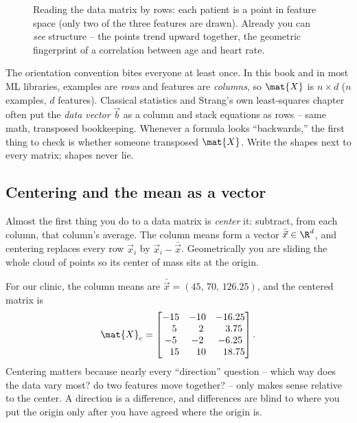 \begin{figure}[H]
\centering
{}
\caption{Reading the data matrix by rows: each patient is a point in feature space (only
two of the three features are drawn). Already you can \emph{see} structure -- the points
trend upward together, the geometric fingerprint of a correlation between age and heart
rate.}
\label{ch34:fig-datacloud}
\end{figure}

\begin{trapbox}
The orientation convention bites everyone at least once. In this book and in most ML
libraries, examples are \emph{rows} and features are \emph{columns}, so $\mat{X}$ is
$n \times d$ ($n$ examples, $d$ features). Classical statistics and Strang's own
least-squares chapter often put the \emph{data vector} $\vec{b}$ as a column and stack
equations as rows -- same math, transposed bookkeeping. Whenever a formula looks
``backwards,'' the first thing to check is whether someone transposed $\mat{X}$. Write
the shapes next to every matrix; shapes never lie.
\end{trapbox}

\subsection{Centering and the mean as a vector}

Almost the first thing you do to a data matrix is \emph{center} it: subtract, from each
column, that column's average. The column means form a vector $\bar{\vec{x}} \in \R^{d}$,
and centering replaces every row $\vec{x}_i$ by $\vec{x}_i - \bar{\vec{x}}$. Geometrically
you are sliding the whole cloud of points so its center of mass sits at the origin.

For our clinic, the column means are $\bar{\vec{x}} = (45,\,70,\,126.25)$, and the
centered matrix is
\[
\mat{X}_c =
\begin{bmatrix}
-15 & -10 & -16.25 \\
\phantom{-}5 & \phantom{-}2 & \phantom{-}3.75 \\
-5 & -2 & -6.25 \\
\phantom{-}15 & \phantom{-}10 & \phantom{-}18.75
\end{bmatrix}.
\]
Centering matters because nearly every ``direction'' question -- which way does the data
vary most? do two features move together? -- only makes sense relative to the center.
A direction is a difference, and differences are blind to where you put the origin only
after you have agreed where the origin is.

